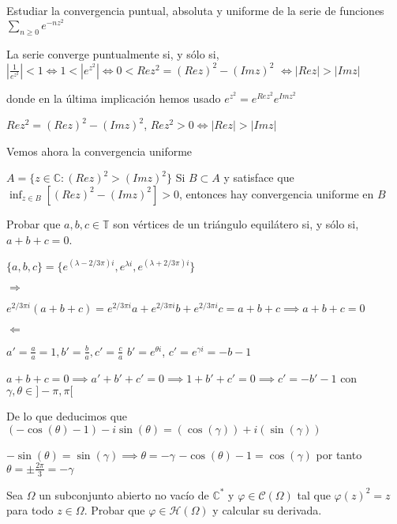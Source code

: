 \begin{ejer}
	Estudiar la convergencia puntual, absoluta y uniforme de la serie de funciones $\sum_{n\geq 0} e^{-nz^2}$
\end{ejer}

\begin{sol}
La serie converge puntualmente si, y sólo si, $| \frac{1}{e^{z^2}} | <1 \Longleftrightarrow 1<|e^{z^2}|  \Longleftrightarrow 0<Rez^2 = (Rez)^2-(Imz)^2 $
$\Longleftrightarrow |Rez| > |Imz|$

donde en la última implicación hemos usado
$e^{z^2} = e^{Rez^2} e^{Imz^2}$

$Rez^2 = (Rez)^2 - (Imz)^2$,
$Rez^2>0 \Longleftrightarrow |Rez| > |Imz|$

Vemos ahora la convergencia uniforme

$A = \{ z\in\mathbb{C} : (Rez)^2>(Imz)^2 \}$
Si $B\subset A$ y satisface que $\inf_{z\in B} [ (Rez)^2-(Imz)^2 ] > 0$, entonces hay convergencia uniforme en $B$
\end{sol}



\begin{ejer}
	Probar que $a, b, c \in\mathbb{T}$ son vértices de un triángulo equilátero si, y sólo si, $a+b+c = 0$.
\end{ejer}

\begin{sol}

$\{ a,b,c \} = \{ e^{(\lambda - 2/3\pi)i}, e^{\lambda i}, e^{(\lambda + 2/3\pi)i} \}$

$\Rightarrow$

$e^{2/3\pi i} (a+b+c) = e^{2/3\pi i} a + e^{2/3\pi i}b + e^{2/3\pi i}c = a+b+c \implies a+b+c=0$

$\Leftarrow$

$a'=\frac{a}{a} = 1, b'=\frac{b}{a}, c'=\frac{c}{a}$
$b'=e^{\theta i}$, $c' = e^{\gamma i} = -b-1$


$a+b+c = 0 \implies a'+b'+c' = 0 \implies 1+b'+c' = 0 \implies c'=-b'-1$ con $\gamma,\theta\in ]-\pi,\pi[$

De lo que deducimos que 
$(-\cos(\theta)-1)-i\sin(\theta) = (\cos(\gamma)) + i(\sin(\gamma))$

$-\sin(\theta) = \sin(\gamma) \implies \theta = -\gamma $
$-\cos(\theta) -1 =  \cos(\gamma)$
por tanto
$\theta = \pm\frac{2\pi}{3} = -\gamma$

\end{sol}




\begin{ejer}
	Sea $\Omega$ un subconjunto abierto no vacío de $\mathbb{C}^{\ast}$ y $\varphi\in\mathcal{C}(\Omega)$ tal que $\varphi(z)^2 = z$ para todo $z\in\Omega$. Probar que $\varphi\in\mathcal{H}(\Omega)$ y calcular su derivada.
\end{ejer}

